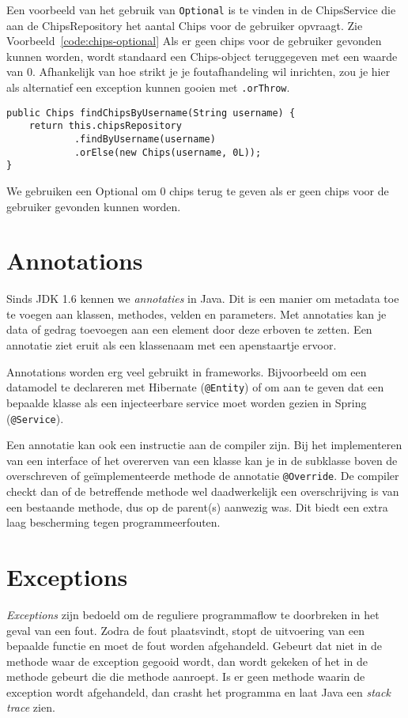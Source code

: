 \documentclass[dutch,a4paper,12pt,doubleside]{book}
\begin{document}
Een voorbeeld van het gebruik van \texttt{Optional} is te vinden in de ChipsService
die aan de ChipsRepository het aantal Chips voor de gebruiker opvraagt. Zie Voorbeeld~\ref{code:chips-optional}
Als er geen chips voor de gebruiker gevonden kunnen worden, wordt standaard een Chips-object teruggegeven met een waarde van 0.
Afhankelijk van hoe strikt je je foutafhandeling wil inrichten,
zou je hier als alternatief een exception kunnen gooien met \texttt{.orThrow}.

\begin{listing}[H]
\begin{verbatim}
public Chips findChipsByUsername(String username) {
    return this.chipsRepository
            .findByUsername(username)
            .orElse(new Chips(username, 0L));
}
\end{verbatim}
\caption{We gebruiken een Optional om 0 chips terug te geven als er geen chips voor de gebruiker gevonden kunnen worden.}
\label{code:chips-optional}
\end{listing}

\section{Annotations}
Sinds JDK 1.6 kennen we \textit{annotaties} in Java. 
Dit is een manier om metadata toe te voegen aan klassen,
methodes, velden en parameters. Met annotaties kan je 
data of gedrag toevoegen aan een element door deze erboven te 
zetten. Een annotatie ziet eruit als een klassenaam met een apenstaartje ervoor.

Annotations worden erg veel gebruikt in frameworks. Bijvoorbeeld
om een datamodel te declareren met Hibernate (\texttt{@Entity})
of om aan te geven dat een bepaalde klasse als een injecteerbare 
service moet worden gezien in Spring (\texttt{@Service}).

Een annotatie kan ook een instructie aan de compiler zijn.
Bij het implementeren van een interface of het overerven van een klasse 
kan je in de subklasse boven de overschreven of geïmplementeerde methode 
de annotatie \texttt{@Override}. De compiler checkt dan of de betreffende
methode wel daadwerkelijk een overschrijving is van een bestaande methode,
dus op de parent(s) aanwezig was. Dit biedt een extra laag bescherming tegen 
programmeerfouten.

\section{Exceptions}
\textit{Exceptions} zijn bedoeld om de reguliere programmaflow
te doorbreken in het geval van een fout. Zodra de fout plaatsvindt, 
stopt de uitvoering van een bepaalde functie en moet de fout worden afgehandeld.
Gebeurt dat niet in de methode waar de exception gegooid wordt, dan wordt gekeken 
of het in de methode gebeurt die die methode aanroept. Is er geen methode waarin 
de exception wordt afgehandeld, dan crasht het programma en laat Java een 
\textit{stack trace} zien.
\end{document}

